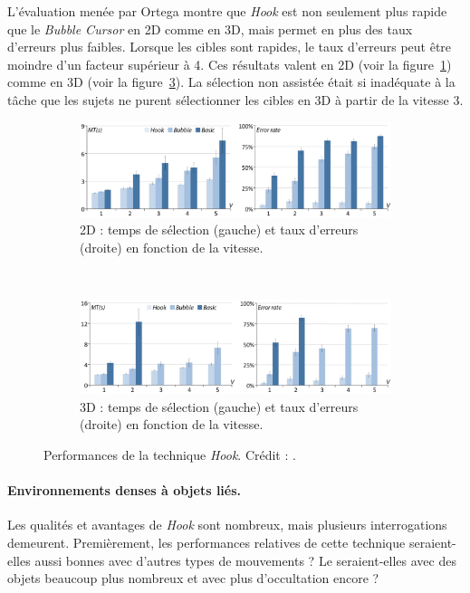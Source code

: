 	L'évaluation menée par Ortega montre que \emph{Hook} est non seulement plus rapide que le \emph{Bubble Cursor} en 2D comme en 3D, mais permet en plus des taux d'erreurs plus faibles. Lorsque les cibles sont rapides, le taux d'erreurs peut être moindre d'un facteur supérieur à 4. Ces résultats valent en 2D (voir la figure~\ref{fig:hookRes2d}) comme en 3D (voir la figure~\ref{fig:hookRes3d}). La sélection non assistée était si inadéquate à la tâche que les sujets ne purent sélectionner les cibles en 3D à partir de la vitesse 3.

	\begin{figure}[!htbp]
		\begin{subfigure}{\textwidth}
			\centering
			\includegraphics[width=\textwidth]{figures/ch2/hookRes2d}
			\caption[\emph{Hook} -- performances en 2D]{2D : temps de sélection (gauche) et taux d'erreurs (droite) en fonction de la vitesse.}
			\label{fig:hookRes2d}
		\end{subfigure}
		~
		\begin{subfigure}{\textwidth}
			\centering
			\includegraphics[width=\textwidth]{figures/ch2/hookRes3d}
			\caption[\emph{Hook} -- performances en 2D]{3D : temps de sélection (gauche) et taux d'erreurs (droite) en fonction de la vitesse.}
			\label{fig:hookRes3d}
		\end{subfigure}
		\caption[\emph{Hook} -- Performances]{Performances de la technique \emph{Hook}. Crédit : \cite{ortega2013hook}.}
	\end{figure}
	
	\paragraph{Environnements denses à objets liés.}
	Les qualités et avantages de \emph{Hook} sont nombreux, mais plusieurs interrogations demeurent. Premièrement, les performances relatives de cette technique seraient-elles aussi bonnes avec d'autres types de mouvements ? Le seraient-elles avec des objets beaucoup plus nombreux et avec plus d'occultation encore ?
	
